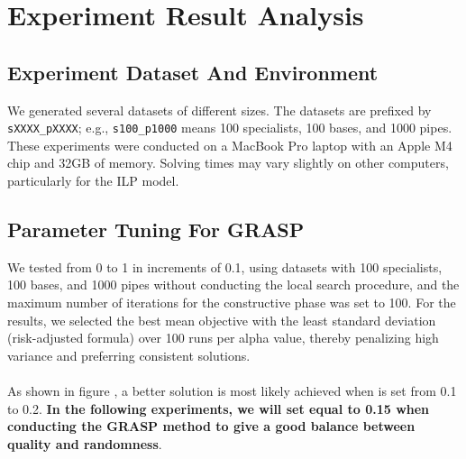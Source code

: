 \documentclass{article}
\begin{document}


\section{Experiment Result Analysis}

\subsection{Experiment Dataset And Environment}

We generated several datasets of different sizes. The datasets are prefixed by \texttt{sXXXX\_pXXXX}; e.g., \texttt{s100\_p1000} means 100 specialists, 100 bases, and 1000 pipes.
These experiments were conducted on a MacBook Pro laptop with an Apple M4 chip and 32GB of memory. Solving times may vary slightly on other computers, particularly for the ILP model.


\subsection{Parameter Tuning For GRASP}

We tested \bm{$\alpha$} from 0 to 1 in increments of 0.1, using datasets with 100 specialists, 100 bases, and 1000 pipes without conducting the local search procedure, and the maximum number of iterations for the constructive phase was set to 100.  For the results, we selected the best mean objective with the least standard deviation (risk-adjusted formula) over 100 runs per alpha value, thereby penalizing high variance and preferring consistent solutions. \\
\\
\noindent As shown in figure , a better solution is most likely achieved when \bm{$\alpha$} is set from 0.1 to 0.2. \textbf{In the following experiments, we will set \bm{$\alpha$} equal to 0.15 when conducting the GRASP method to give a good balance between quality and randomness}.
\end{document}
